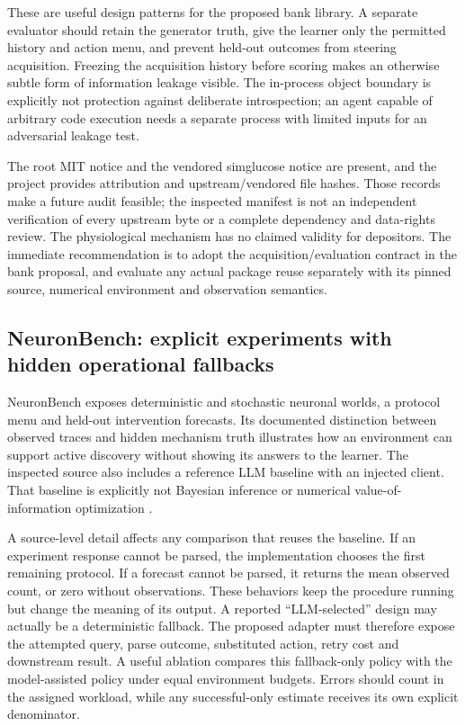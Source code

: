 These are useful design patterns for the proposed bank library. A separate
evaluator should retain the generator truth, give the learner only the
permitted history and action menu, and prevent held-out outcomes from steering
acquisition. Freezing the acquisition history before scoring makes an
otherwise subtle form of information leakage visible. The in-process object
boundary is explicitly not protection against deliberate introspection;
an agent capable of arbitrary code execution needs a separate process with
limited inputs for an adversarial leakage test.

The root MIT notice and the vendored simglucose notice are present, and the
project provides attribution and upstream/vendored file hashes. Those records
make a future audit feasible; the inspected manifest is not an independent
verification of every upstream byte or a complete dependency and data-rights
review. The physiological mechanism has no claimed validity for depositors.
The immediate recommendation is to adopt the acquisition/evaluation contract
in the bank proposal, and evaluate any actual package reuse separately with
its pinned source, numerical environment and observation semantics.

\subsection{NeuronBench: explicit experiments with hidden operational fallbacks}

NeuronBench exposes deterministic and stochastic neuronal worlds, a protocol
menu and held-out intervention forecasts. Its documented distinction between
observed traces and hidden mechanism truth illustrates how an environment can
support active discovery without showing its answers to the learner. The
inspected source also includes a reference LLM baseline with an injected
client. That baseline is explicitly not Bayesian inference or numerical
value-of-information optimization
\citep{exec13_active_neuronbench}.

A source-level detail affects any comparison that reuses the baseline.
If an experiment response cannot be parsed, the implementation chooses the
first remaining protocol. If a forecast cannot be parsed, it returns the mean
observed count, or zero without observations. These behaviors keep the
procedure running but change the meaning of its output. A reported
``LLM-selected'' design may actually be a deterministic fallback. The proposed
adapter must therefore expose the attempted query, parse outcome, substituted
action, retry cost and downstream result. A useful ablation compares this
fallback-only policy with the model-assisted policy under equal environment
budgets. Errors should count in the assigned workload, while any
successful-only estimate receives its own explicit denominator.


